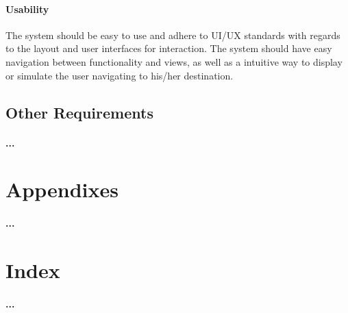 \documentclass[runningheads,a4paper]{llncs}
\begin{document}
\paragraph{Usability \\}
 The system should be easy to use and adhere to UI/UX standards with regards to the layout and user interfaces for interaction. The system should have easy navigation between functionality and views, as well as a intuitive way to display or simulate the user navigating to his/her destination.
 



\subsection{Other Requirements}
\paragraph{...}

\section{Appendixes}
\paragraph{...}

\section{Index}
\paragraph{...}
\end{document}
